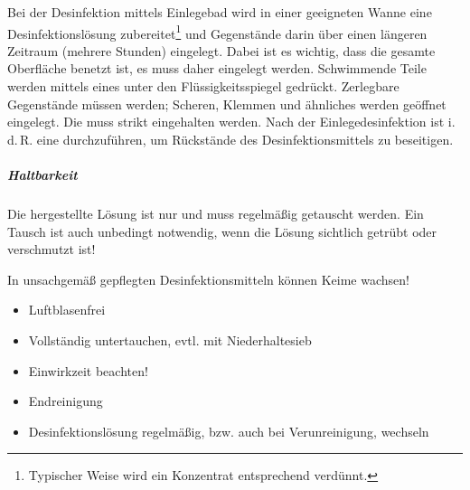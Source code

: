 {%

Bei der Desinfektion
mittels Einlegebad wird in einer geeigneten Wanne eine Desinfektionslösung
zubereitet\footnote{Typischer Weise wird ein Konzentrat
entsprechend verdünnt.} und Gegenstände darin über einen
längeren Zeitraum (mehrere Stunden) eingelegt.
Dabei ist es wichtig, dass die gesamte Oberfläche benetzt
ist, es muss daher  eingelegt werden.
Schwimmende Teile werden mittels eines 
unter den Flüssigkeitsspiegel gedrückt. Zerlegbare
Gegenstände müssen  werden;
Scheren, Klemmen und ähnliches werden geöffnet eingelegt. Die
 muss strikt eingehalten werden. Nach der
Einlegedesinfektion ist i.\,d.\,R. eine 
durchzuführen, um Rückstände des Desinfektionsmittels zu
beseitigen.



\subparagraph{Haltbarkeit}
Die hergestellte Lösung ist nur  und muss
regelmäßig getauscht werden. Ein Tausch ist auch unbedingt
notwendig, wenn die Lösung sichtlich getrübt oder verschmutzt
ist!

\begin{Danger}
  \item In unsachgemäß gepflegten Desinfektionsmitteln können Keime wachsen!
\end{Danger}

}{
\begin{itemize}
  \item Luftblasenfrei
  \item Vollständig untertauchen, evtl. mit Niederhaltesieb
  \item Einwirkzeit beachten! 
  \item Endreinigung
  \item Desinfektionslösung regelmäßig, bzw. auch bei Verunreinigung, wechseln
\end{itemize}
}{}{}{}


